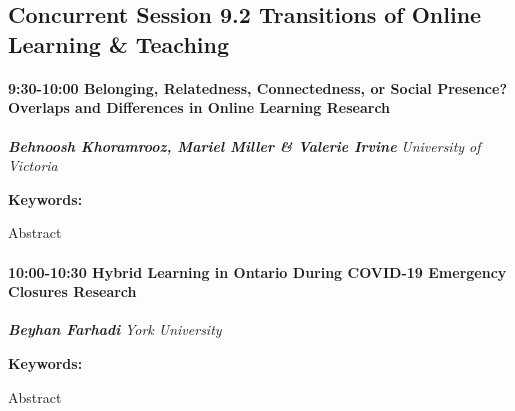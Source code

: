 \documentclass[
]{book}
\begin{document}
\hypertarget{concurrent-session-9.2-transitions-of-online-learning-teaching}{%
\subsection*{Concurrent Session 9.2 \textbar{} Transitions of Online Learning \& Teaching}\label{concurrent-session-9.2-transitions-of-online-learning-teaching}}

\begin{session}
\hypertarget{belonging-relatedness-connectedness-or-social-presence-overlaps-and-differences-in-online-learning-research}{%
\paragraph*{\texorpdfstring{9:30-10:00 \textbar{} \textbf{Belonging,
Relatedness, Connectedness, or Social Presence? Overlaps and Differences
in Online Learning} \textbar{}
Research}{9:30-10:00 \textbar{} Belonging, Relatedness, Connectedness, or Social Presence? Overlaps and Differences in Online Learning \textbar{} Research}}\label{belonging-relatedness-connectedness-or-social-presence-overlaps-and-differences-in-online-learning-research}}

\textbf{\emph{Behnoosh Khoramrooz, Mariel Miller \& Valerie Irvine}}
\textbar{} \emph{University of Victoria}

\textbf{Keywords:}

Abstract
\end{session}

\begin{session}
\hypertarget{hybrid-learning-in-ontario-during-covid-19-emergency-closures-research}{%
\paragraph*{\texorpdfstring{10:00-10:30 \textbar{} \textbf{Hybrid
Learning in Ontario During COVID-19 Emergency Closures} \textbar{}
Research}{10:00-10:30 \textbar{} Hybrid Learning in Ontario During COVID-19 Emergency Closures \textbar{} Research}}\label{hybrid-learning-in-ontario-during-covid-19-emergency-closures-research}}

\textbf{\emph{Beyhan Farhadi}} \textbar{} \emph{York University}

\textbf{Keywords:}

Abstract
\end{session}
\end{document}
